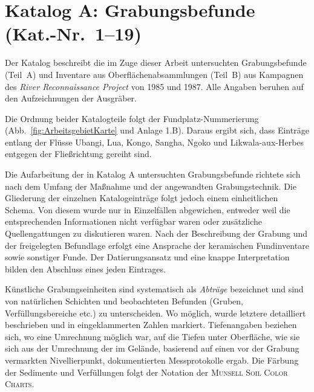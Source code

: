 
\chapter*{Katalog A: Grabungsbefunde (Kat.-Nr.~1--19)}\label{sec:BefBeschr}
\begin{multicols}{2}
\raggedcolumns
\noindent Der Katalog beschreibt die im Zuge dieser Arbeit untersuchten Grabungsbefunde (Teil~A) und Inventare aus Oberflächenabsammlungen (Teil~B) aus Kampagnen des \textit{River Reconnaissance Project} von 1985 und 1987. Alle Angaben beruhen auf den Aufzeichnungen der Ausgräber.

Die Ordnung beider Katalogteile folgt der Fundplatz-Nummerierung (Abb.~\ref{fig:ArbeitsgebietKarte} und Anlage 1.B). Daraus ergibt sich, dass Einträge entlang der Flüsse \mbox{Ubangi}, \mbox{Lua}, \mbox{Kongo}, \mbox{Sangha}, \mbox{Ngoko} und \mbox{Likwala}-\mbox{aux}-\mbox{Herbes} entgegen der Fließrichtung gereiht sind. 

Die Aufarbeitung der in Katalog A untersuchten Grabungsbefunde richtete sich nach dem Umfang der Maßnahme und der angewandten Grabungstechnik. Die Gliederung der einzelnen Katalogeinträge folgt jedoch einem einheitlichen Schema. Von diesem wurde nur in Einzelfällen abgewichen, entweder weil die entsprechenden Informationen nicht verfügbar waren oder zusätzliche Quellengattungen zu diskutieren waren. Nach der Beschreibung der Grabung und der freigelegten Befundlage erfolgt eine Ansprache der keramischen Fundinventare sowie sonstiger Funde. Der Datierungsansatz und eine knappe Interpretation bilden den Abschluss eines jeden Eintrages.

Künstliche Grabungseinheiten sind systematisch als \textit{Abträge} bezeichnet und sind von natürlichen Schichten und beobachteten Befunden (Gruben, Verfüllungsbereiche etc.) zu unterscheiden. Wo möglich, wurde letztere detailliert beschrieben und in eingeklammerten Zahlen markiert. Tiefenangaben beziehen sich, wo eine Umrechnung möglich war, auf die Tiefen unter Oberfläche, wie sie sich aus der Umrechnung der im Gelände, basierend auf einen vor der Grabung vermarkten Nivellierpunkt, dokumentierten Messprotokolle ergab. Die Färbung der Sedimente und Verfüllungen folgt der Notation der \textsc{Munsell Soil Color Charts}.


\end{multicols}
